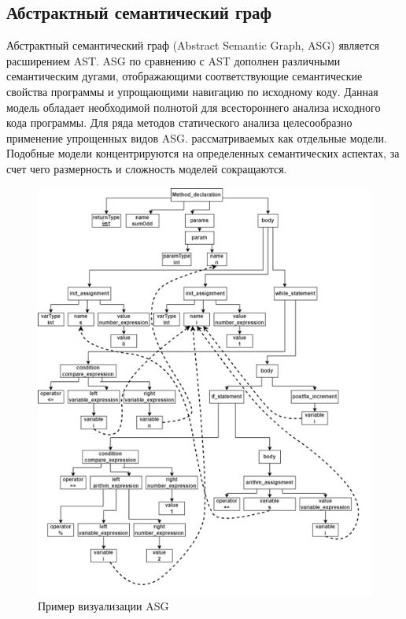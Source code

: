 \subsection{Абстрактный семантический граф} \label{ch1:subsec-title-abbr}
Абстрактный семантический граф (Abstract Semantic Graph, ASG) является расширением AST. ASG по сравнению с AST дополнен различными семантическим дугами, отображающими соответствующие семантические свойства программы и упрощающими навигацию по исходному коду. Данная модель обладает необходимой полнотой для всестороннего анализа исходного кода программы. Для ряда методов статического анализа целесообразно применение упрощенных видов ASG. рассматриваемых как отдельные модели. Подобные модели концентрируются на определенных семантических аспектах, за счет чего размерность и сложность моделей сокращаются.
\begin{figure}[h]
	\center
	\includegraphics [scale=0.9] {my_folder/images/my/6}
	\caption{Пример визуализации ASG}
	\label{fig:6}  
\end{figure}

